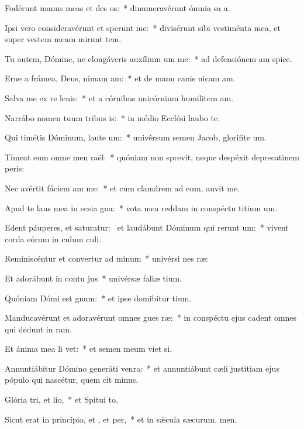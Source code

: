 \item Fodérunt manus meas et des os:~* dinumeravérunt ómnia sa a.
\item Ipsi vero consideravérunt et sperunt me:~* divisérunt sibi vestiménta mea, et super vestem meam mirunt tem.
\item Tu autem, Dómine, ne elongáveris auxílium um  me:~* ad defensiónem am spice.
\item Erue a frámea, Deus, nimam am:~* et de manu canis nicam am.
\item Salva me ex re lenis:~* et a córnibus unicórnium humilitem am.
\item Narrábo nomen tuum tribus is:~* in médio Ecclési laubo te.
\item Qui timétis Dóminum, laute um:~* univérsum semen Jacob, glorifite um.
\item Tímeat eum omne men raël:~* quóniam non sprevit, neque despéxit deprecatinem peris:
\item Nec avértit fáciem am  me:~* et cum clamárem ad eum, auvit me.
\item Apud te laus mea in ecsia gna:~* vota mea reddam in conspéctu titium um.
\item Edent páuperes, et saturatur:~\pscross{} et laudábunt Dóminum qui rerunt um:~* vivent corda eórum in culum culi.
\item Reminiscéntur et convertur ad minum~* univérsi nes ræ:
\item Et adorábunt in contu jus~* univérsæ faliæ tium.
\item Quóniam Dómi est gnum:~* et ipse domibitur tium.
\item Manducavérunt et adoravérunt omnes gues ræ:~* in conspéctu ejus cadent omnes qui dedunt in ram.
\item Et ánima mea li vet:~* et semen meum viet si.
\item Annuntiábitur Dómino generáti venra:~* et annuntiábunt cæli justítiam ejus pópulo qui nascétur, quem cit minus.
\item Glória tri, et lio,~* et Spitui to.
\item Sicut erat in princípio, et , et per,~* et in sǽcula sæcurum. men.

